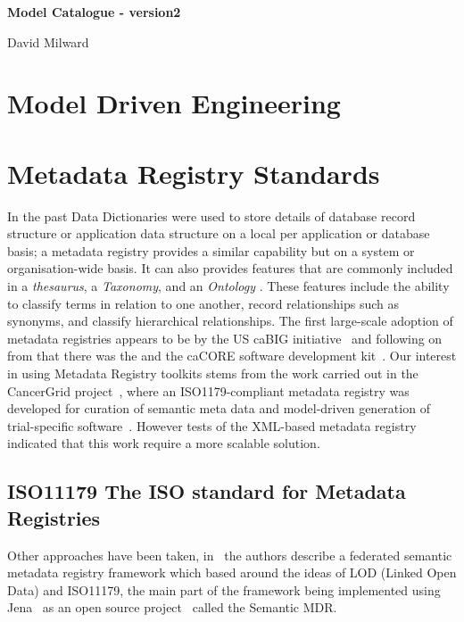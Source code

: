 \documentclass{article}
\begin{document}
 
\bgroup \parindent 0pt
{\Large\textbf{Model Catalogue - version2}}

\vskip 4mm 

{\Large {David Milward}}

\egroup

\vskip 14mm

\noindent

\section{Model Driven Engineering}

\section{Metadata Registry Standards}

In the past Data Dictionaries were used to store details of database record structure or application data structure on a local per application or database basis; a metadata registry provides a similar capability but on a system or organisation-wide basis. It can also provides features that are commonly included in a \emph{thesaurus}, a \emph{Taxonomy}, and an \emph{Ontology} . These features include the ability to classify terms in relation to one another, record relationships such as synonyms, and classify hierarchical relationships. The first large-scale adoption of metadata registries appears to be by the US caBIG initiative~\cite{kunz09} and following on from that there was the  and the caCORE software development kit~\cite{koma08}. Our interest in using Metadata Registry toolkits stems from the work carried out in the CancerGrid project~\cite{davi14}, where an ISO1179-compliant metadata registry was developed for curation of semantic meta data and model-driven generation of trial-specific software~\cite{davi12, Abler2011}. However tests of the XML-based metadata registry indicated that this work require a more scalable solution.



\subsection{ISO11179 The ISO standard for Metadata Registries}

Other approaches have been taken, in~\cite{Sinaci} the authors describe a federated semantic metadata registry framework which based around the ideas of LOD (Linked Open Data) and ISO11179, the main part of the framework being implemented using Jena~\cite{jena}  as an open source project~\cite{semanticmdr} called the Semantic MDR.
\end{document}
